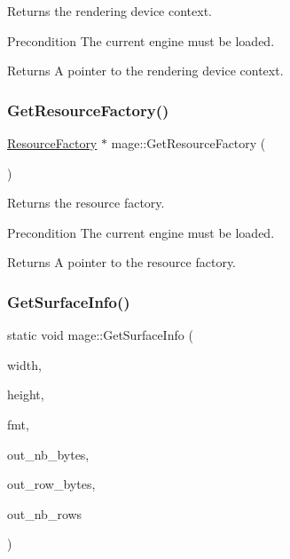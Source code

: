 Returns the rendering device context.

\begin{DoxyPrecond}{Precondition}
The current engine must be loaded. 
\end{DoxyPrecond}
\begin{DoxyReturn}{Returns}
A pointer to the rendering device context. 
\end{DoxyReturn}
\hypertarget{namespacemage_a36a7338e52586e714ef646dea200a115}{}\label{namespacemage_a36a7338e52586e714ef646dea200a115} 
\subsubsection{\texorpdfstring{Get\+Resource\+Factory()}{GetResourceFactory()}}
{\footnotesize\ttfamily \hyperlink{classmage_1_1_resource_factory}{Resource\+Factory} $\ast$ mage\+::\+Get\+Resource\+Factory (\begin{DoxyParamCaption}{ }\end{DoxyParamCaption})}

Returns the resource factory.

\begin{DoxyPrecond}{Precondition}
The current engine must be loaded. 
\end{DoxyPrecond}
\begin{DoxyReturn}{Returns}
A pointer to the resource factory. 
\end{DoxyReturn}
\hypertarget{namespacemage_a7b67bb6f38f3e787fb3561d236b88bd2}{}\label{namespacemage_a7b67bb6f38f3e787fb3561d236b88bd2} 
\subsubsection{\texorpdfstring{Get\+Surface\+Info()}{GetSurfaceInfo()}}
{\footnotesize\ttfamily static void mage\+::\+Get\+Surface\+Info (\begin{DoxyParamCaption}\item[{\+\_\+\+In\+\_\+ size\+\_\+t}]{width,  }\item[{\+\_\+\+In\+\_\+ size\+\_\+t}]{height,  }\item[{\+\_\+\+In\+\_\+ D\+X\+G\+I\+\_\+\+F\+O\+R\+M\+AT}]{fmt,  }\item[{\+\_\+\+Out\+\_\+opt\+\_\+ size\+\_\+t $\ast$}]{out\+\_\+nb\+\_\+bytes,  }\item[{\+\_\+\+Out\+\_\+opt\+\_\+ size\+\_\+t $\ast$}]{out\+\_\+row\+\_\+bytes,  }\item[{\+\_\+\+Out\+\_\+opt\+\_\+ size\+\_\+t $\ast$}]{out\+\_\+nb\+\_\+rows }\end{DoxyParamCaption})\hspace{0.3cm}{\ttfamily [static]}}

